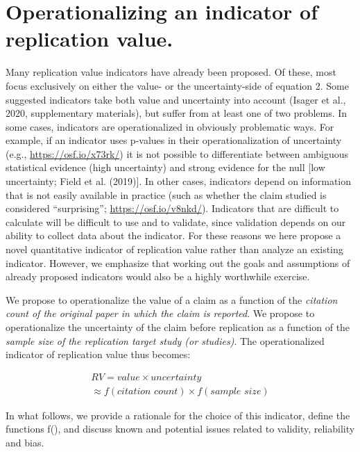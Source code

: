 \documentclass[
  english,
  jou,floatsintext]{apa6}
\begin{document}
\hypertarget{operationalizing-an-indicator-of-replication-value.}{%
\section{Operationalizing an indicator of replication value.}\label{operationalizing-an-indicator-of-replication-value.}}

Many replication value indicators have already been proposed. Of these, most focus exclusively on either the value- or the uncertainty-side of equation 2. Some suggested indicators take both value and uncertainty into account (Isager et al., 2020, supplementary materials), but suffer from at least one of two problems. In some cases, indicators are operationalized in obviously problematic ways. For example, if an indicator uses p-values in their operationalization of uncertainty (e.g., \url{https://osf.io/x73rk/}) it is not possible to differentiate between ambiguous statistical evidence (high uncertainty) and strong evidence for the null {[}low uncertainty; Field et al. (2019){]}. In other cases, indicators depend on information that is not easily available in practice (such as whether the claim studied is considered ``surprising''; \url{https://osf.io/v8nkd/}). Indicators that are difficult to calculate will be difficult to use and to validate, since validation depends on our ability to collect data about the indicator. For these reasons we here propose a novel quantitative indicator of replication value rather than analyze an existing indicator. However, we emphasize that working out the goals and assumptions of already proposed indicators would also be a highly worthwhile exercise.

We propose to operationalize the value of a claim as a function of the \emph{citation count of the original paper in which the claim is reported}. We propose to operationalize the uncertainty of the claim before replication as a function of the \emph{sample size of the replication target study (or studies)}. The operationalized indicator of replication value thus becomes:

\begin{equation} 
  \tag{3}
  \begin{split} 
  RV=value\times uncertainty \\
  \approx f(\textit{citation count}) \times f(\textit{sample size})
  \end{split}
  \label{eq:3}
\end{equation}

In what follows, we provide a rationale for the choice of this indicator, define the functions f(), and discuss known and potential issues related to validity, reliability and bias.
\end{document}
